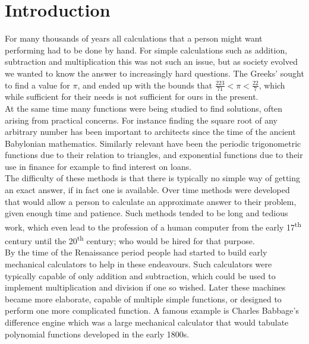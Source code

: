 \section{Introduction}
\label{SEC_"Introduction"}
For many thousands of years all calculations that a person might want performing had to be done by hand. For simple calculations such as addition, subtraction and multiplication this was not such an issue, but as society evolved we wanted to know the answer to increasingly hard questions. The Greeks' sought to find a value for $\pi$, and ended up with the bounds that $\frac{223}{71} < \pi < \frac{22}{7}$\cite{ART_ArchPi}\cite[][106]{BOK_CalcBook}, which while sufficient for their needs is not sufficient for ours in the present. \\

At the same time many functions were being studied to find solutions, often arising from practical concerns. For instance finding the square root of any arbitrary number has been important to architects since the time of the ancient Babylonian mathematics\cite{ONL_BabylAnly}. Similarly relevant have been the periodic trigonometric functions due to their relation to triangles, and exponential functions due to their use in finance for example to find interest on loans.\\

The difficulty of these methods is that there is typically no simple way of getting an exact answer, if in fact one is available. Over time methods were developed that would allow a person to calculate an approximate answer to their problem, given enough time and patience. Such methods tended to be long and tedious work, which even lead to the profession of a human computer from the early 17\textsuperscript{th} century until the 20\textsuperscript{th} century; who would be hired for that purpose.\\

By the time of the Renaissance period people had started to build early mechanical calculators to help in these endeavours. Such calculators were typically capable of only addition and subtraction, which could be used to implement multiplication and division if one so wished. Later these machines became more elaborate, capable of multiple simple functions, or designed to perform one more complicated function. A famous example is Charles Babbage's difference engine\cite{ONL_Babbage} which was a large mechanical calculator that would tabulate polynomial functions developed in the early 1800s.\\

